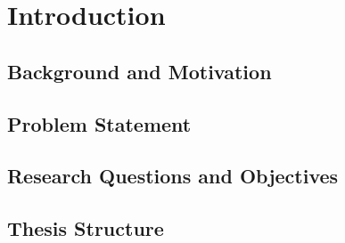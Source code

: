 \chapter{Introduction}
\label{ch:intro}

\section{Background and Motivation}

\section{Problem Statement}

\section{Research Questions and Objectives}

\section{Thesis Structure}
